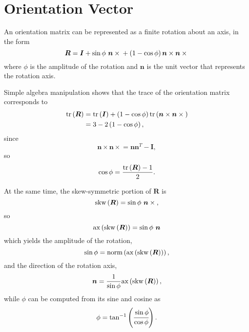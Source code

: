 \documentclass[10pt,dvips,fleqn,subeqn]{report}
\newcommand{\T}[1]{\bm{#1}}
\begin{document}
\section{Orientation Vector}
An orientation matrix can be represented as a finite rotation about 
an axis, in the form
\begin{equation}
	\T{R} = \T{I}
	+ \sin\phi \ \T{n}\times{}
	+ \plbr{1 - \cos\phi} \T{n}\times\T{n}\times{}
\end{equation}
where $\phi$ is the amplitude of the rotation and $\T{n}$ 
is the unit vector that represents the rotation axis.

Simple algebra manipulation shows that the trace of the orientation matrix
corresponds to 
\begin{align}
	\mathrm{tr}\plbr{\T{R}}
	&= \mathrm{tr}\plbr{\T{I}}
	+ \plbr{1 - \cos\phi}\mathrm{tr}\plbr{\T{n}\times\T{n}\times{}} \\
	&= 3 - 2 \plbr{1 - \cos\phi} ,
\end{align}
since
\begin{equation}
	\T{n}\times\T{n}\times{} = \T{n} \T{n}^T - \T{I} ,
\end{equation}
so
\begin{equation}
	\cos\phi = \frac{\mathrm{tr}\plbr{\T{R}} - 1}{2} .
\end{equation}

At the same time, the skew-symmetric portion of $\T{R}$ is
\begin{equation}
	\mathrm{skw}\plbr{\T{R}} = \sin\phi \ \T{n}\times{} ,
\end{equation}
so
\begin{equation}
	\mathrm{ax}\plbr{\mathrm{skw}\plbr{\T{R}}} = \sin\phi \ \T{n}
\end{equation}
which yields the amplitude of the rotation,
\begin{equation}
	\sin\phi
	= \mathrm{norm}\plbr{\mathrm{ax}\plbr{\mathrm{skw}\plbr{\T{R}}}} ,
\end{equation}
and the direction of the rotation axis,
\begin{equation}
	\T{n} = \frac{1}{\sin\phi}\mathrm{ax}\plbr{\mathrm{skw}\plbr{\T{R}}} ,
\end{equation}
while $\phi$ can be computed from its sine and cosine as
\begin{equation}
	\phi = \tan^{-1}\left( \cfrac{\sin\phi}{\cos\phi} \right) .
\end{equation}
\end{document}
